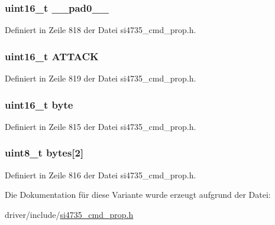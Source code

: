 \subsubsection[{\+\_\+\+\_\+pad0\+\_\+\+\_\+}]{\setlength{\rightskip}{0pt plus 5cm}uint16\+\_\+t \+\_\+\+\_\+pad0\+\_\+\+\_\+}\label{unionfm__agc__atk__rate_a77132c2c26a75f5b8751b235cda23828}


Definiert in Zeile 818 der Datei si4735\+\_\+cmd\+\_\+prop.\+h.

\hypertarget{unionfm__agc__atk__rate_a23a6aee9d921440c53996214126047a3}{}
\subsubsection[{A\+T\+T\+A\+C\+K}]{\setlength{\rightskip}{0pt plus 5cm}uint16\+\_\+t A\+T\+T\+A\+C\+K}\label{unionfm__agc__atk__rate_a23a6aee9d921440c53996214126047a3}


Definiert in Zeile 819 der Datei si4735\+\_\+cmd\+\_\+prop.\+h.

\hypertarget{unionfm__agc__atk__rate_ab0549c1b5ea980a02e7eab77e21fea49}{}
\subsubsection[{byte}]{\setlength{\rightskip}{0pt plus 5cm}uint16\+\_\+t byte}\label{unionfm__agc__atk__rate_ab0549c1b5ea980a02e7eab77e21fea49}


Definiert in Zeile 815 der Datei si4735\+\_\+cmd\+\_\+prop.\+h.

\hypertarget{unionfm__agc__atk__rate_a46e4c05d20a047ec169f60d3167e912e}{}
\subsubsection[{bytes}]{\setlength{\rightskip}{0pt plus 5cm}uint8\+\_\+t bytes\mbox{[}2\mbox{]}}\label{unionfm__agc__atk__rate_a46e4c05d20a047ec169f60d3167e912e}


Definiert in Zeile 816 der Datei si4735\+\_\+cmd\+\_\+prop.\+h.



Die Dokumentation für diese Variante wurde erzeugt aufgrund der Datei\+:\begin{DoxyCompactItemize}
\item 
driver/include/\hyperlink{si4735__cmd__prop_8h}{si4735\+\_\+cmd\+\_\+prop.\+h}\end{DoxyCompactItemize}
